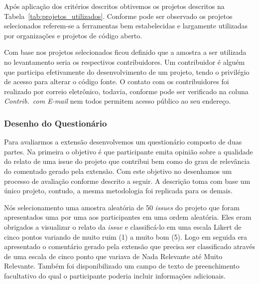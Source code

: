 Após aplicação dos critérios descritos obtivemos os projetos descritos na
Tabela~\ref{tab:projetos_utilizados}. Conforme pode ser observado os projetos
selecionados referem-se a ferramentas bem estabelecidas e largamente utilizadas
por organizações e projetos de código aberto.

\begin{table}[htpb]
\centering
{}
\caption{Projetos utilizados no levantamento com profissionais. Os dados
	apresentados tem como referência 23/04/2017.}
\label{tab:projetos_utilizados}
\end{table}

Com base nos projetos selecionados ficou definido que a amostra a ser utilizada
no levantamento seria os respectivos contribuidores. Um contribuidor é alguém
que participa efetivamente do desenvolvimento de um projeto, tendo o privilégio
de acesso para alterar o código fonte. O contato com os contribuidores foi
realizado por correio eletrônico, todavia, conforme pode ser verificado na
coluna \textit{Contrib.\ com E-mail} nem todos permitem acesso público ao seu
endereço.

\subsubsection{Desenho do Questionário}
\label{ssub:sug_melhoria_desenho_questionario}

Para avaliarmos a extensão desenvolvemos um questionário composto de duas
partes. Na primeira o objetivo é que participante emita opinião sobre a
qualidade do relato de uma issue do projeto que contribui bem como do grau de
relevância do comentado gerado pela extensão. Com este objetivo no desenhamos um
processo de avaliação conforme descrito a seguir. A descrição toma com base um
único projeto, contudo, a mesma metodologia foi replicada para os demais.

Nós selecionamento uma amostra aleatória de 50 \textit{issues} do projeto que
foram apresentados uma por uma aos participantes em uma ordem aleatória. Eles
eram obrigados a visualizar o relato da \textit{issue} e classificá-lo em uma
escala Likert de cinco pontos variando de muito ruim (1) a muito bom (5). Logo
em seguida era apresentado o comentário gerado pela extensão que precisa ser
classificado através de uma escala de cinco ponto que variava de Nada Relevante
até Muito Relevante. Também foi disponibilizado um campo de texto de
preenchimento facultativo do qual o participante poderia incluir informações
adicionais.

